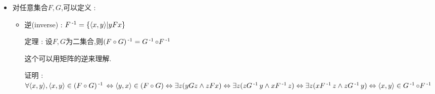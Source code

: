 {{{\begin{itemize}
{          \begin{itemize}
            \item 定义域(domain) : $dom\ R = \set{x | \exists y(x R y)}$
            \item 值域(range) : $ran\ R = \set{y | \exists x(x R y)}$
            \item 域(field) : $fld\ R = dom\ R \unionSet ran\ R$
          \end{itemize}

          例 : \begin{itemize}
            \item $R_1 = \set{a,b}$
            \item $R_2 = \set{a,b,\dependent{c,d},\dependent{e,f}}$
            \item $R_3 = \set{\dependent{1,2}, \dependent{3,4}, \dependent{5,6}}$
          \end{itemize}

          当$a,b$不是有序对时,$R_1$和$R_2$不是关系.
          \begin{itemize}
            \item $dom\ R_1 = \emptyset,ran\ R_1 = \emptyset,fld\ R_1 = \emptyset$
            \item $dom\ R_2 = \set{c,e}, ran\ R_2 = \set{d,f},fld\ R_2 = \set{c,d,e,f}$
            \item $dom\ R_3 = \set{1,3,5}, ran\ R_3 = \set{2,4,6}, fld\ R_3 \set{1,2,3,4,5,6}$
          \end{itemize}
          }
    \item {
          对任意集合$F,G$,可以定义 :

          \begin{itemize}
            \item {
                  逆(inverse) : $F\operatorname{^{-1}} = \left\{ \langle x,y\rangle | yFx \right\}$

                  定理 : 设$F,G$为二集合,则$(F \circ G)\operatorname{^{-1}} = G\operatorname{^{-1}} \circ F\operatorname{^{-1}}$

                  这个可以用矩阵的逆来理解.

                  证明 : \begin{math}
                    \forall \langle x,y\rangle,\langle x,y\rangle \in (F \circ G)\operatorname{^{-1}} \\
                    \Leftrightarrow \langle y,x\rangle \in (F \circ G) \\
                    \Leftrightarrow \exists z (yGz \land zFx) \\
                    \Leftrightarrow \exists z (z G\operatorname{^{-1}} y \land x F\operatorname{^{-1}} z) \\
                    \Leftrightarrow \exists z (x F\operatorname{^{-1}} z \land z G\operatorname{^{-1}} y) \Leftrightarrow \langle x,y\rangle \in G\operatorname{^{-1}} \circ F\operatorname{^{-1}}
                  \end{math}

}
\end{itemize}}
\end{itemize}}}}
